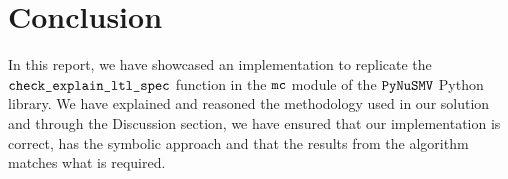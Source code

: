 \section{Conclusion}
In this report, we have showcased an implementation to replicate the $\verb|check_explain_ltl_spec|$ function in the $\verb|mc|$ module of the $\verb|PyNuSMV|$ Python library. We have explained and reasoned the methodology used in our solution and through the Discussion section, we have ensured that our implementation is correct, has the symbolic approach and that the results from the algorithm matches what is required.


